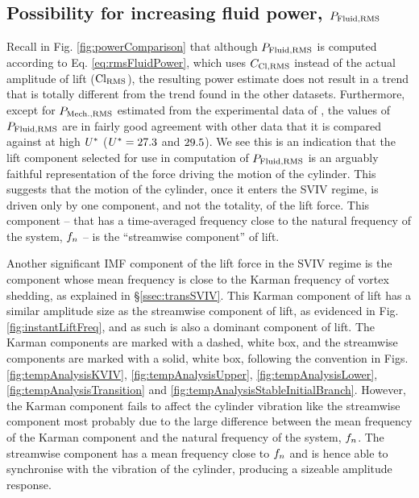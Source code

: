 \documentclass[a4paper,fleqn]{cas-sc}
\begin{document}
\subsection{Possibility for increasing fluid power, $P_{\text{Fluid,RMS}}$} \label{ssec:possIncrease}
Recall in Fig. \ref{fig:powerComparison} that although $P_{\text{Fluid,RMS}}$ is computed according to Eq. \ref{eq:rmsFluidPower}, which uses $C_{\text{Cl},\text{RMS}}$ instead of the actual \rms{} amplitude of lift ($\text{Cl}_{\text{RMS}}$), the resulting power estimate does not result in a trend that is totally different from the trend found in the other datasets. Furthermore, except for $P_{\text{Mech.,RMS}}$ estimated from the experimental data of \citet{Nguyen2012}, the values of $P_{\text{Fluid,RMS}}$ are in fairly good agreement with other data that it is compared against at high $U^{*}$ ($U^{*} = 27.3$ and $29.5$). We see this is an indication that the lift component selected for use in computation of $P_{\text{Fluid,RMS}}$ is an arguably faithful representation of the force driving the motion of the cylinder. This suggests that the motion of the cylinder, once it enters the SVIV regime, is driven only by one component, and not the totality, of the lift force. This component -- that has a time-averaged frequency close to the natural frequency of the system, $f_{n}$ -- is the ``streamwise component'' of lift.

Another significant IMF component of the lift force in the SVIV regime is the component whose mean frequency is close to the Karman frequency of vortex shedding, as explained in \S\ref{ssec:transSVIV}. This Karman component of lift has a similar amplitude size as the streamwise component of lift, as evidenced in Fig. \ref{fig:instantLiftFreq}, and as such is also a dominant component of lift. The Karman components are marked with a dashed, white box, and the streamwise components are marked with a solid, white box, following the convention in Figs. \ref{fig:tempAnalysisKVIV}, \ref{fig:tempAnalysisUpper}, \ref{fig:tempAnalysisLower}, \ref{fig:tempAnalysisTransition} and \ref{fig:tempAnalysisStableInitialBranch}. However, the Karman component fails to affect the cylinder vibration like the streamwise component most probably due to the large difference between the mean frequency of the Karman component and the natural frequency of the system, $f_{n}$.  The streamwise component has a mean frequency close to $f_{n}$ and is hence able to synchronise with the vibration of the cylinder, producing a sizeable amplitude response.
\end{document}

